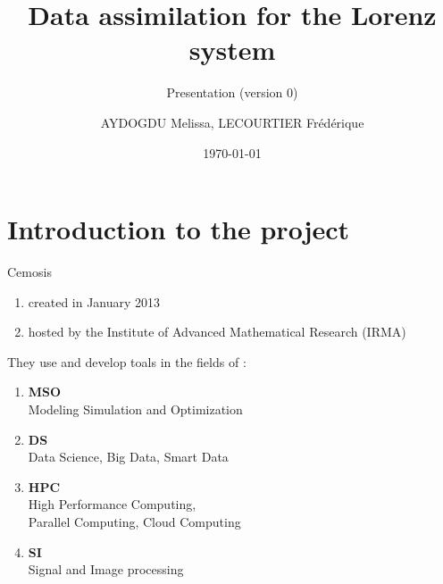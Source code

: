 \documentclass[10pt,xcolor={table,dvipsnames},t]{beamer}
\title[Lorenz]{Data assimilation for the Lorenz system}
\subtitle{Presentation (version 0)}
\author[name]{AYDOGDU Melissa, LECOURTIER Frédérique}
\institute{\large Strasbourg University}
\date{\today}
\begin{document}
	
	\begin{frame}
		\titlepage
	\end{frame}
	
	\AtBeginSection[]{
		\begin{frame}
			\vfill
			\centering
			\begin{beamercolorbox}[sep=5pt,shadow=true,rounded=true]{subtitle}
				\usebeamerfont{title}\insertsectionhead\par%
			\end{beamercolorbox}
			\vfill
		\end{frame}
	}


	\section{Introduction to the project}

	\begin{frame}{Cemosis}
		
		\begin{minipage}{0.4\hsize}
			\centering
			\begin{enumerate}[$\rightarrow$]
				\item created in January 2013
				\item hosted by the Institute of Advanced Mathematical Research (IRMA)
			\end{enumerate}
		\end{minipage} \quad
		\begin{minipage}{0.5\hsize}
			They use and develop toals in the fields of : 
			\begin{enumerate}[\textbullet]
				\item \textbf{MSO} \\
				Modeling Simulation and Optimization
				\item \textbf{DS} \\
				Data Science, Big Data, Smart Data
				\item \textbf{HPC} \\
				High Performance Computing, \\
				Parallel Computing, Cloud Computing
				\item \textbf{SI} \\
				Signal and Image processing
			\end{enumerate}
		\end{minipage}
	
	\end{frame}
\end{document}
